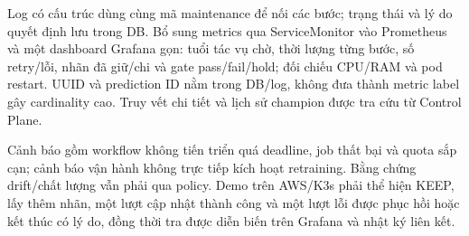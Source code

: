 Log có cấu trúc dùng cùng mã maintenance để nối các bước; trạng thái và lý do quyết định lưu trong DB. Bổ sung metrics qua ServiceMonitor vào Prometheus và một dashboard Grafana gọn: tuổi tác vụ chờ, thời lượng từng bước, số retry/lỗi, nhãn đã giữ/chi và gate pass/fail/hold; đối chiếu CPU/RAM và pod restart. UUID và prediction ID nằm trong DB/log, không đưa thành metric label gây cardinality cao. Truy vết chi tiết và lịch sử champion được tra cứu từ Control Plane.

Cảnh báo gồm workflow không tiến triển quá deadline, job thất bại và quota sắp cạn; cảnh báo vận hành không trực tiếp kích hoạt retraining. Bằng chứng drift/chất lượng vẫn phải qua policy. Demo trên AWS/K3s phải thể hiện KEEP, lấy thêm nhãn, một lượt cập nhật thành công và một lượt lỗi được phục hồi hoặc kết thúc có lý do, đồng thời tra được diễn biến trên Grafana và nhật ký liên kết.
